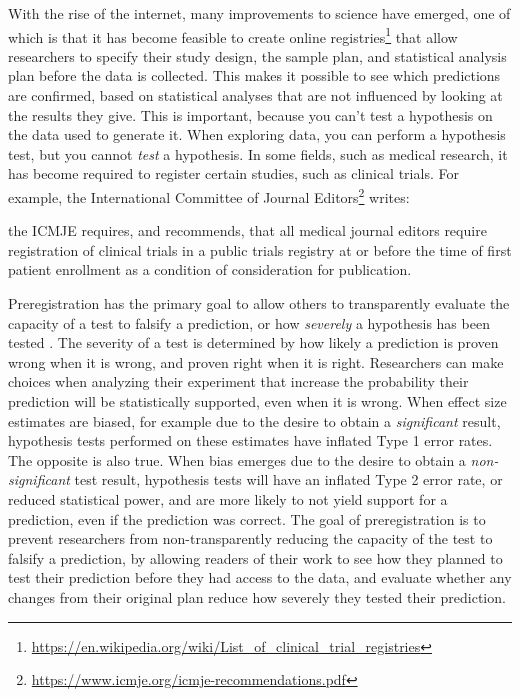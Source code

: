 \documentclass[
  oneside]{krantz}
\renewenvironment{quote}{\begin{VF}}{\end{VF}}
\renewcommand{\href}[2]{#2\footnote{\url{#1}}}
\begin{document}
With the rise of the internet, many improvements to science have emerged, one of which is that it has become feasible to create online \href{https://en.wikipedia.org/wiki/List_of_clinical_trial_registries}{registries} that allow researchers to specify their study design, the sample plan, and statistical analysis plan before the data is collected. This makes it possible to see which predictions are confirmed, based on statistical analyses that are not influenced by looking at the results they give. This is important, because you can't test a hypothesis on the data used to generate it. When exploring data, you can perform a hypothesis test, but you cannot \emph{test} a hypothesis. In some fields, such as medical research, it has become required to register certain studies, such as clinical trials. For example, the \href{https://www.icmje.org/icmje-recommendations.pdf}{International Committee of Journal Editors} writes:

\begin{quote}
the ICMJE requires, and recommends, that all medical journal editors require registration of clinical trials in a public trials registry at or before the time of first patient enrollment as a condition of consideration for publication.
\end{quote}

Preregistration has the primary goal to allow others to transparently evaluate the capacity of a test to falsify a prediction, or how \emph{severely} a hypothesis has been tested \citep{lakens_value_2019}. The severity of a test is determined by how likely a prediction is proven wrong when it is wrong, and proven right when it is right. Researchers can make choices when analyzing their experiment that increase the probability their prediction will be statistically supported, even when it is wrong. When effect size estimates are biased, for example due to the desire to obtain a \emph{significant} result, hypothesis tests performed on these estimates have inflated Type 1 error rates. The opposite is also true. When bias emerges due to the desire to obtain a \emph{non-significant} test result, hypothesis tests will have an inflated Type 2 error rate, or reduced statistical power, and are more likely to not yield support for a prediction, even if the prediction was correct. The goal of preregistration is to prevent researchers from non-transparently reducing the capacity of the test to falsify a prediction, by allowing readers of their work to see how they planned to test their prediction before they had access to the data, and evaluate whether any changes from their original plan reduce how severely they tested their prediction.
\end{document}
